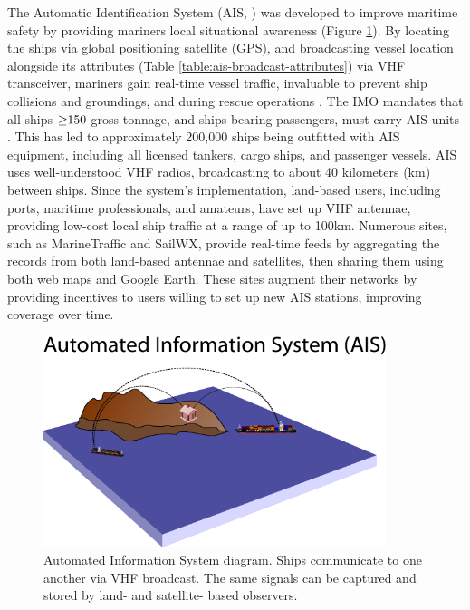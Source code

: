 The Automatic Identification System (AIS, \citealp{no20041028,Tetreault2002}) was developed to improve maritime safety by providing mariners local situational awareness (Figure \ref{fig:ais-overview}). By locating the ships via global positioning satellite (GPS), and broadcasting vessel location alongside its attributes (Table \ref{table:ais-broadcast-attributes}) via VHF transceiver, mariners gain real-time vessel traffic, invaluable to prevent ship collisions and groundings, and during rescue operations \citep{Itu-r2010}.  The IMO mandates that all ships $\geq\negthickspace 150$ gross tonnage, and ships bearing passengers, must carry AIS units \citep{solas}. This has led to approximately 200,000 ships being outfitted with AIS equipment, including all licensed tankers, cargo ships, and passenger vessels. AIS uses well-understood VHF radios, broadcasting to about 40 kilometers (km) between ships. Since the system's implementation, land-based users, including ports, maritime professionals, and amateurs, have set up VHF antennae, providing low-cost local ship traffic at a range of up to 100km. Numerous sites, such as MarineTraffic \citep{MarineTraffic} and SailWX, provide real-time feeds by aggregating the records from both land-based antennae and satellites, then sharing them using both web maps and Google Earth. These sites augment their networks by providing incentives to users willing to set up new AIS stations, improving coverage over time.

\begin{figure}[htbp]
  \centering
  \includegraphics[width=100mm]{figures/towers/drawing-myriad.pdf}
  \caption[Automated Information System diagram]{Automated Information System diagram. Ships communicate to one another via VHF broadcast. The same signals can be captured and stored by land- and satellite- based observers.}
  \label{fig:ais-overview}
\end{figure}

